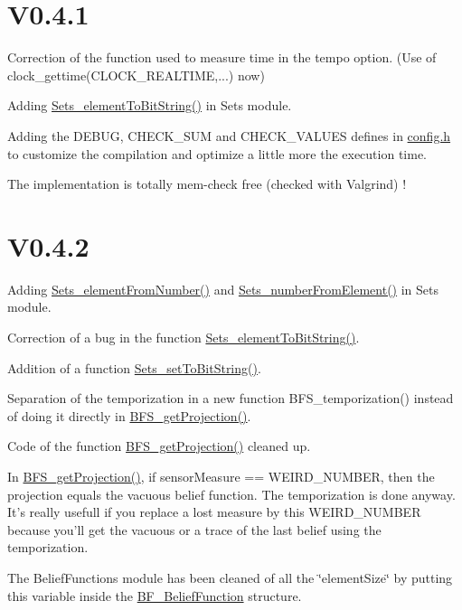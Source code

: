 \hypertarget{version_sec_v04_1_subsec}{}\section{V0.4.1}\label{version_sec_v04_1_subsec}
Correction of the function used to measure time in the tempo option. (Use of clock\_\-gettime(CLOCK\_\-REALTIME,...) now) \par
 Adding \hyperlink{_sets_8c_a7693e000c2760240139628cd1b33d2f1}{Sets\_\-elementToBitString()} in Sets module. \par
 Adding the DEBUG, CHECK\_\-SUM and CHECK\_\-VALUES defines in \hyperlink{config_8h}{config.h} to customize the compilation and optimize a little more the execution time. \par
 The implementation is totally mem-\/check free (checked with Valgrind) !\hypertarget{version_sec_v04_2_subsec}{}\section{V0.4.2}\label{version_sec_v04_2_subsec}
Adding \hyperlink{_sets_8c_ab9ee97ae54608f3fb5784b29503d62b6}{Sets\_\-elementFromNumber()} and \hyperlink{_sets_8c_a71aeb52bad651c5129b57d7e69e5f480}{Sets\_\-numberFromElement()} in Sets module. \par
 Correction of a bug in the function \hyperlink{_sets_8c_a7693e000c2760240139628cd1b33d2f1}{Sets\_\-elementToBitString()}. \par
 Addition of a function \hyperlink{_sets_8c_a76fd7c759c8e24d17fdc240cc003c969}{Sets\_\-setToBitString()}. \par
 Separation of the temporization in a new function BFS\_\-temporization() instead of doing it directly in \hyperlink{_beliefs_from_sensors_8c_a0e545c6a35093eb43b27325db61c2216}{BFS\_\-getProjection()}. \par
 Code of the function \hyperlink{_beliefs_from_sensors_8c_a0e545c6a35093eb43b27325db61c2216}{BFS\_\-getProjection()} cleaned up. \par
 In \hyperlink{_beliefs_from_sensors_8c_a0e545c6a35093eb43b27325db61c2216}{BFS\_\-getProjection()}, if sensorMeasure == WEIRD\_\-NUMBER, then the projection equals the vacuous belief function. The temporization is done anyway. It's really usefull if you replace a lost measure by this WEIRD\_\-NUMBER because you'll get the vacuous or a trace of the last belief using the temporization. \par
 The BeliefFunctions module has been cleaned of all the \char`\"{}elementSize\char`\"{} by putting this variable inside the \hyperlink{struct_b_f___belief_function}{BF\_\-BeliefFunction} structure. \par
